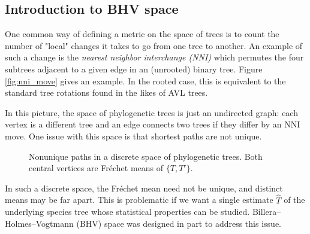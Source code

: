 \subsection{Introduction to BHV space}

One common way of defining a metric on the space of trees is to count the number of "local" changes it takes to go from one tree to another. An example of such a change is the \textit{nearest neighbor interchange (NNI)} which permutes the four subtrees adjacent to a given edge in an (unrooted) binary tree. Figure \ref{fig:nni_move} gives an example. In the rooted case, this is equivalent to the standard tree rotations found in the likes of AVL trees.

 In this picture, the space of phylogenetic trees is just an undirected graph: each vertex is a different tree and an edge connects two trees if they differ by an NNI move. One issue with this space is that shortest paths are not unique. 

\begin{figure}[htbp]
\centering
{}
    \caption{Nonunique paths in a discrete space of phylogenetic trees. Both
    central vertices are Fr\'echet means of $\{T,T'\}$.}
\label{fig:oval_graph}
\end{figure}

In such a discrete space, the Fr\'echet mean need not be unique, and distinct
means may be far apart. This is problematic if we want a single estimate
$\widehat{T}$ of the underlying species tree whose statistical properties can
be studied. Billera--Holmes--Vogtmann (BHV) space
\cite{BILLERA_2001_bhv_space} was designed in part to address this issue.


